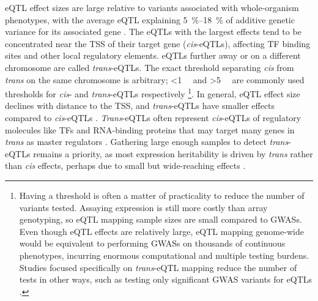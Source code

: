 \gls{eQTL} effect sizes are large relative to variants associated with whole-organism phenotypes,
with the average \gls{eQTL} explaining \SIrange{5}{18}{\percent} of additive genetic variance for its associated gene \autocite{gaffney2013GlobalPropertiesFunctional}.
The \glspl{eQTL} with the largest effects tend to be concentrated near the \gls{TSS} of their target gene (\textit{cis}-\glspl{eQTL}), affecting \gls{TF} binding sites and other local regulatory elements.
\glspl{eQTL} further away or on a different chromosome are called \textit{trans}-\glspl{eQTL}.
The exact threshold separating \textit{cis} from \textit{trans} on the same chromosome is arbitrary; \SI{<1}{\mega\bp} and \SI{>5}{\mega\bp} are commonly used thresholds for \textit{cis}- and \textit{trans}-\glspl{eQTL} respectively \autocite{westra2014GenomeFunctionStudying,albert2015RoleRegulatoryVariation,vosa2018UnravelingPolygenicArchitecture}%
\footnote{
    Having a threshold is often a matter of practicality to reduce the number of variants tested.
    Assaying expression is still more costly than array genotyping, so \gls{eQTL} mapping sample sizes are small compared to \glspl{GWAS}.
    Even though \gls{eQTL} effects are relatively large, 
    \gls{eQTL} mapping genome-wide would be equivalent to performing \glspl{GWAS} on thousands of continuous phenotypes,
    incurring enormous computational and multiple testing burdens.
    Studies focused specifically on \textit{trans}-\gls{eQTL} mapping reduce the number of tests in other ways, 
    such as testing only significant \gls{GWAS} variants for \glspl{eQTL} \autocite{vosa2018UnravelingPolygenicArchitecture}.
}.
In general, \gls{eQTL} effect size declines with distance to the \gls{TSS}, and \textit{trans}-\glspl{eQTL} have smaller effects compared to \textit{cis}-\glspl{eQTL} \autocite{vandiedonck2017GeneticAssociationMolecular}.
\textit{Trans}-\glspl{eQTL} often represent \textit{cis}-\glspl{eQTL} of regulatory molecules like \glspl{TF} and RNA-binding proteins that may target many genes in \textit{trans} as master regulators \autocite{fairfax2012GeneticsGeneExpression,albert2015RoleRegulatoryVariation}.
Gathering large enough samples to detect \textit{trans}-\glspl{eQTL} remains a priority,
as most expression heritability is driven by \textit{trans} rather than \textit{cis} effects,
perhaps due to small but wide-reaching effects \autocite{liu2019TransEffectsGene}.

